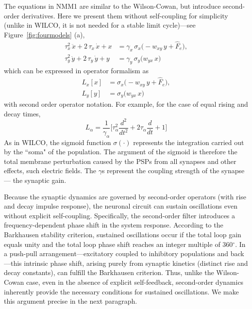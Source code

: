 \documentclass[12pt]{article}
\numberwithin{equation}{section}
\begin{document}
 
The equations in NMM1  are similar to the Wilson-Cowan, but introduce second-order derivatives. Here we present them without self-coupling for simplicity (unlike in WILCO, it is not needed for a stable limit cycle)---see Figure~\ref{fig:fourmodels} (a),
\begin{equation}
    \begin{aligned}
            \tau_x^{2}\,\ddot{x} + 2\,\tau_x\,\dot{x} +x
              &= \gamma_x\,\sigma_x\bigl(  - w_{xy}\,y + \hat F_e \bigr),\\
            \tau_y^{2}\,\ddot{y} + 2\,\tau_y\,\dot{y} +y
              &= \gamma_y\,\sigma_y\bigl(w_{yx}\,x  \bigr) 
          \end{aligned}
\end{equation}
which can be expressed in operator formalism as
\begin{equation} \label{eq:nmm1-simple}
    \begin{aligned}
            L_x[x]
              &= \sigma_x\bigl(  - w_{xy}\,y + \hat F_e \bigr),\\
           L_y[y] &= \sigma_y\bigl(w_{yx}\,x  \bigr) 
          \end{aligned}
\end{equation}
with second order operator notation. For example, for the case of equal rising and decay times, 
\begin{equation}\label{eq:L-operator-same-a}
L_\alpha = \frac{1}{\gamma_\alpha} \big [ \tau_\alpha^2 \frac{d^2}{dt^2} + 2 \tau_\alpha \frac{d}{dt} + 1 \big]
\end{equation}
As in WILCO, the sigmoid function $\sigma(\cdot)$ represents the integration carried out by the ``soma" of the population. The argument of the sigmoid is therefore the total membrane perturbation caused by the PSPs from all synapses and other effects, such electric fields.  The  $\gamma$s represent the coupling strength of the synapse --- the synaptic gain.  


Because the synaptic dynamics are governed by second-order operators (with rise and decay impulse response), the neuronal circuit can sustain oscillations even without explicit self-coupling. Specifically, the second-order filter introduces a frequency-dependent phase shift in the system response. According to the Barkhausen stability criterion, sustained oscillations occur if the total loop gain equals unity and the total loop phase shift reaches an integer multiple of 360$^\circ$. In a push-pull arrangement—excitatory coupled to inhibitory populations and back—this intrinsic phase shift, arising purely from synaptic kinetics (distinct rise and decay constants), can fulfill the Barkhausen criterion. Thus, unlike the Wilson-Cowan case,  even in the absence of explicit self-feedback, second-order dynamics inherently provide the necessary conditions for sustained oscillations. We make this argument precise in the next paragraph.
\end{document}
